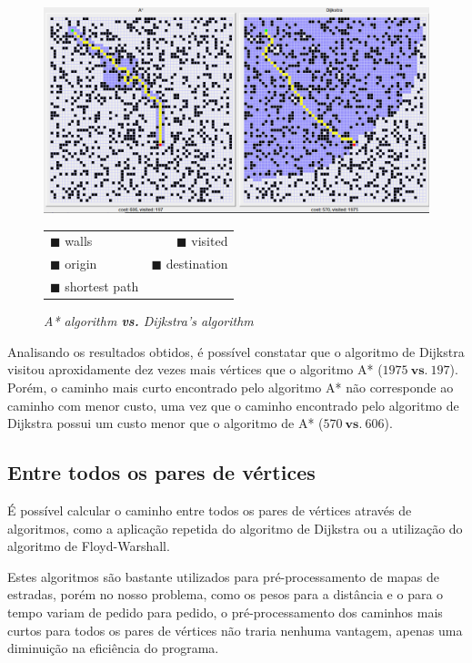 \documentclass[article, a4paper, 12pt, oneside]{memoir}
\begin{document}
\begin{figure}[h]
\centering
\includegraphics[scale=0.4]{pathfinder2}
\caption{\emph{A* algorithm \textbf{vs.} Dijkstra's algorithm}}
\begin{tabular}{ l r }
\color{black} $\blacksquare$ \color{black} walls & \color{Periwinkle} $\blacksquare$ \color{black} visited \\
\color{green} $\blacksquare$ \color{black} origin & \color{red} $\blacksquare$ \color{black} destination \\
\color{yellow} $\blacksquare$ \color{black} shortest path
\end{tabular}
\end{figure}

Analisando os resultados obtidos, é possível constatar que o algoritmo de Dijkstra visitou aproxidamente dez vezes mais vértices que o algoritmo A* ($1975 ~ \textbf{vs.} ~ 197$). Porém, o caminho mais curto encontrado pelo algoritmo A* não corresponde ao caminho com menor custo, uma vez que o caminho encontrado pelo algoritmo de Dijkstra possui um custo menor que o algoritmo de A* ($570 ~ \textbf{vs.} ~ 606$).

\subsection{Entre todos os pares de vértices}
É possível calcular o caminho entre todos os pares de vértices através de algoritmos, como a aplicação repetida do algoritmo de Dijkstra ou a utilização do algoritmo de Floyd-Warshall.

Estes algoritmos são bastante utilizados para pré-processamento de mapas de estradas, porém no nosso problema, como os pesos para a distância e o para o tempo variam de pedido para pedido, o pré-processamento dos caminhos mais curtos para todos os pares de vértices não traria nenhuma vantagem, apenas uma diminuição na eficiência do programa.
\end{document}
